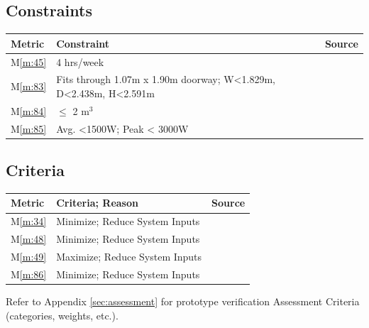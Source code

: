 \documentclass{report}
\begin{document}
\subsection{Constraints}
\label{sec:constraints}
\begin{tabular}{|l|p{12.55cm}|p{1.3cm}|}
    \hline
    \textbf{Metric} & \textbf{Constraint} & \textbf{Source} \\
    \hline
    M\ref{m:45} & 4 hrs/week & \cite{applicantguide}\\
    \hline
    M\ref{m:83} & Fits through 1.07m x 1.90m doorway; W<1.829m, D<2.438m, H<2.591m & \cite{applicantguide} \\
    \hline
    M\ref{m:84} & $\le$ 2 m${}^3$ & \cite{applicantguide}\\
    \hline
    M\ref{m:85} & Avg. <1500W; Peak < 3000W & \cite{applicantguide}\\
    \hline
\end{tabular}

\subsection{Criteria}
\label{sec:criteria}
\begin{tabular}{|l|p{12.55cm}|p{1.3cm}|}
    \hline
    \textbf{Metric} & \textbf{Criteria; Reason} & \textbf{Source} \\
    \hline
    M\ref{m:34} & Minimize; Reduce System Inputs & \cite{applicantguide} \\
    \hline
    M\ref{m:48} & Minimize; Reduce System Inputs & \cite{applicantguide} \\
    \hline
    M\ref{m:49} & Maximize; Reduce System Inputs & \cite{applicantguide} \\
    \hline
    M\ref{m:86} & Minimize; Reduce System Inputs & \cite{applicantguide} \\
    \hline
\end{tabular}

Refer to Appendix \ref{sec:assessment} for prototype verification Assessment Criteria (categories, weights, etc.).

\newpage
\end{document}
